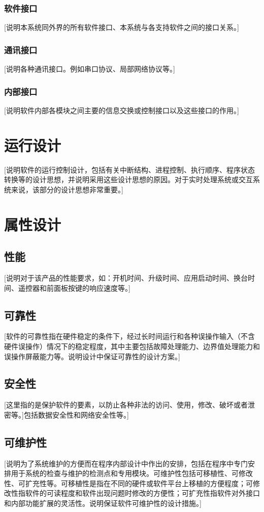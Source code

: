 \documentclass[10pt,a4paper,titlepage]{article} %
\begin{document}
\subsubsection{软件接口}
[说明本系统同外界的所有软件接口、本系统与各支持软件之间的接口关系。]\newline
\subsubsection{通讯接口}
[说明各种通讯接口。例如串口协议、局部网络协议等。]\newline
\subsubsection{内部接口}
[说明软件内部各模块之间主要的信息交换或控制接口以及这些接口的作用。]\newline
\section{运行设计}
[说明软件的运行控制设计，包括有关中断结构、进程控制、执行顺序、程序状态转换等的设计思想，并说明采用这些设计思想的原因。对于实时处理系统或交互系统来说，该部分的设计思想非常重要。]\newline
\section{属性设计}
\subsection{性能}
[说明对于该产品的性能要求，如：开机时间、升级时间、应用启动时间、换台时间、遥控器和前面板按键的响应速度等。]\newline
\subsection{可靠性}
[软件的可靠性指在硬件稳定的条件下，经过长时间运行和各种误操作输入（不含硬件误操作）情况下的稳定程度，其中主要包括故障处理能力、边界值处理能力和误操作屏蔽能力等。说明设计中保证可靠性的设计方案。]\newline
\subsection{安全性}
[这里指的是保护软件的要素，以防止各种非法的访问、使用，修改、破坏或者泄密等。]包括数据安全性和网络安全性等。]\newline
\subsection{可维护性}
[说明为了系统维护的方便而在程序内部设计中作出的安排，包括在程序中专门安排用于系统的检查与维护的检测点和专用模块。可维护性包括可移植性、可修改性、可扩充性等。可移植性是指在不同的硬件或软件平台上移植的方便程度；可修改性指软件的可读程度和软件出现问题时修改的方便性；可扩充性指软件对外接口和内部功能扩展的灵活性。说明保证软件可维护性的设计措施。]\newline
\end{document}
